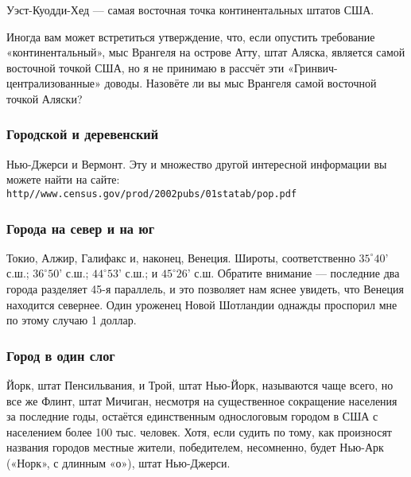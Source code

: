 Уэст-Куодди-Хед %
--- самая восточная точка континентальных штатов США.\heart
                                                                                                                


Иногда вам может встретиться утверждение,  что, если опустить  требование «континентальный», мыс Врангеля %
на острове Атту, %
штат Аляска, является самой восточной точкой США,  но я не принимаю в рассчёт эти «Гринвич-централизованные»  доводы. 
Назовёте ли вы мыс Врангеля самой восточной точкой Аляски?




\subsubsection*{Городской и деревенский}%


Нью-Джерси и Вермонт. Эту и множество другой интересной информации вы можете найти на сайте:\\
\texttt{http//www.census.gov/prod/2002pubs/01statab/pop.pdf} 
 \heart                                                                                                      




\subsubsection*{Города на север и на юг}%


Токио, Алжир, Галифакс и, наконец, Венеция. Широты, соответственно
$35^\circ 40’$ с.ш.;  $36^\circ 50’$ с.ш.; $44^\circ 53’$ с.ш.; и $45^\circ 26’$ с.ш. 
Обратите внимание --- последние два города разделяет 45-я параллель, и это позволяет нам яснее увидеть, что Венеция находится севернее. Один уроженец Новой Шотландии однажды проспорил мне по этому случаю 1 доллар.\heart




\subsubsection*{Город в один слог}%


Йорк, штат Пенсильвания, и Трой, штат Нью-Йорк, называются чаще всего, но все же Флинт, штат Мичиган, несмотря на существенное сокращение населения за последние годы, остаётся единственным однослоговым городом в США с населением более 100 тыс. человек.  Хотя, если судить по тому, как произносят названия городов местные жители, победителем, несомненно, будет Нью-Арк («Норк», с длинным «о»),  штат Нью-Джерси. \heart






